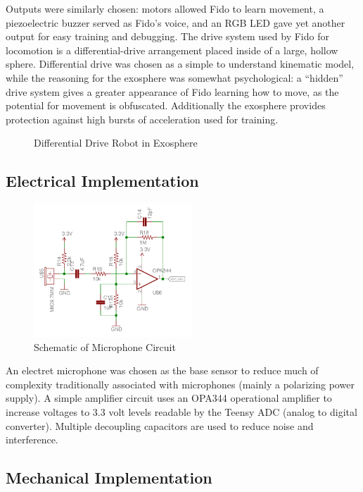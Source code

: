 Outputs were similarly chosen: motors allowed Fido to learn movement, a piezoelectric buzzer served as Fido's voice, and an RGB LED gave yet another output for easy training and debugging.  The drive system used by Fido for locomotion is a differential-drive arrangement placed inside of a large, hollow sphere.  Differential drive was chosen as a simple to understand kinematic model, while the reasoning for the exosphere was somewhat psychological: a ``hidden'' drive system gives a greater appearance of Fido learning how to move, as the potential for movement is obfuscated.  Additionally the exosphere provides protection against high bursts of acceleration used for training.

\begin{figure}
	\centering
	
	\caption{Differential Drive Robot in Exosphere}
\end{figure}

\subsection{Electrical Implementation}

\begin{figure}[ht]
	\centering
	\includegraphics[height=5cm]{Figures/micDiagram.png}
	\caption{Schematic of Microphone Circuit}
\end{figure}

An electret microphone was chosen as the base sensor to reduce much of complexity traditionally associated with microphones (mainly a polarizing power supply).  A simple amplifier circuit uses an OPA344 operational amplifier to increase voltages to 3.3 volt levels readable by the Teensy ADC (analog to digital converter).  Multiple decoupling capacitors are used to reduce noise and interference.

\subsection{Mechanical Implementation}